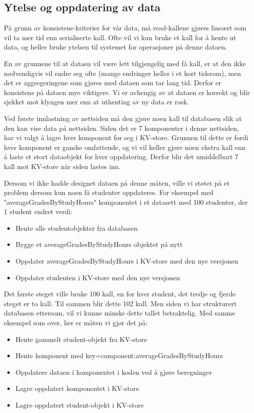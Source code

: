 \subsection{Ytelse og oppdatering av data}
På grunn av konsistens-kriterier for vår data, må read-kallene gjøres lineært som vil ta mer tid enn serialiserte kall. Ofte vil vi kun bruke et kall for å hente ut data, og heller bruke ytelsen til systemet for operasjoner på denne dataen.

En av grunnene til at dataen vil være lett tilgjengelig med få kall, er at den ikke nødvendigvis vil endre seg ofte (mange endringer heller i et kort tidsrom), men det er aggregeringene som gjøres med dataen som tar lang tid. Derfor er konsistens på dataen mye viktigere. Vi er avhengig av at dataen er korrekt og blir sjekket mot klyngen mer enn at uthenting av ny data er rask.

Ved første innlastning av nettsiden må den gjøre noen kall til databasen slik at den kan vise data på nettsiden. Siden det er 7 komponenter i denne nettsiden, har vi valgt å lagre hver komponent for seg i KV-store. Grunnen til dette er fordi hver komponent er ganske omfattende, og vi vil heller gjøre noen ekstra kall enn å laste et stort dataobjekt for hver oppdatering. Derfor blir det umiddelbart 7 kall mot KV-store når siden lastes inn.

Dersom vi ikke hadde designet dataen på denne måten, ville vi støtet på et problem dersom kun noen få studenter oppdateres. For eksempel med "averageGradesByStudyHours" komponentet i et datasett med 100 studenter, der 1 student endret verdi:

\begin{itemize}
  \item Hente alle studentobjekter fra databasen
  \item Bygge et averageGradesByStudyHours objektet på nytt
  \item Oppdater averageGradesByStudyHours i KV-store med den nye versjonen
  \item Oppdater studenten i KV-store med den nye versjonen
\end{itemize}

Det første steget ville bruke 100 kall, en for hver student, det tredje og fjerde steget er to kall. Til sammen blir dette 102 kall. Men siden vi har strukturert databasen ettersom, vil vi kunne minske dette tallet betraktelig. Med samme eksempel som over, her er måten vi gjør det på:

\begin{itemize}
  \item Hente gammelt student-objekt fra KV-store
  \item Hente komponent med key=component:averageGradesByStudyHours
  \item Oppdatere dataen i komponentet i koden ved å gjøre beregninger
  \item Lagre oppdatert komponentet i KV-store
  \item Lagre oppdatert student-objekt i KV-store
\end{itemize}

